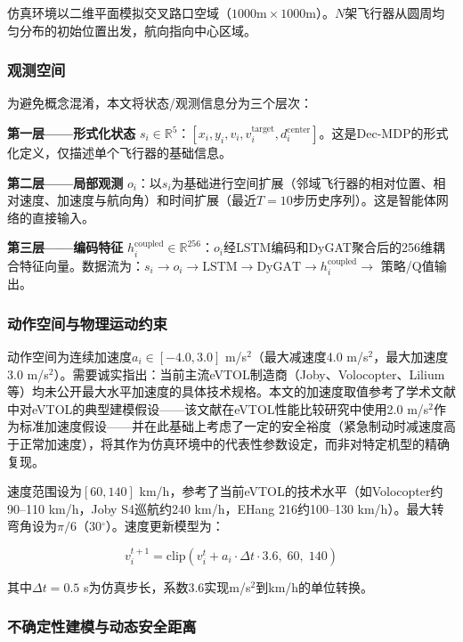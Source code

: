 \documentclass[12pt,a4paper,UTF8]{ctexart}
\begin{document}
仿真环境以二维平面模拟交叉路口空域（$1000\text{m} \times 1000\text{m}$）。$N$架飞行器从圆周均匀分布的初始位置出发，航向指向中心区域。

\subsubsection{观测空间}

为避免概念混淆，本文将状态/观测信息分为三个层次：

\textbf{第一层——形式化状态} $s_i \in \mathbb{R}^5$：$[x_i, y_i, v_i, v_i^{\text{target}}, d_i^{\text{center}}]$。这是Dec-MDP的形式化定义，仅描述单个飞行器的基础信息。

\textbf{第二层——局部观测} $o_i$：以$s_i$为基础进行空间扩展（邻域飞行器的相对位置、相对速度、加速度与航向角）和时间扩展（最近$T=10$步历史序列）。这是智能体网络的直接输入。

\textbf{第三层——编码特征} $h_i^{\text{coupled}} \in \mathbb{R}^{256}$：$o_i$经LSTM编码和DyGAT聚合后的256维耦合特征向量。数据流为：$s_i \to o_i \to \text{LSTM} \to \text{DyGAT} \to h_i^{\text{coupled}} \to$ 策略/Q值输出。

\subsubsection{动作空间与物理运动约束}

动作空间为连续加速度$a_i \in [-4.0, 3.0]$ m/s$^2$（最大减速度4.0 m/s$^2$，最大加速度3.0 m/s$^2$）。需要诚实指出：当前主流eVTOL制造商（Joby、Volocopter、Lilium等）均未公开最大水平加速度的具体技术规格。本文的加速度取值参考了学术文献中对eVTOL的典型建模假设\cite{ref25}——该文献在eVTOL性能比较研究中使用2.0 m/s$^2$作为标准加速度假设——并在此基础上考虑了一定的安全裕度（紧急制动时减速度高于正常加速度），将其作为仿真环境中的代表性参数设定，而非对特定机型的精确复现。

速度范围设为$[60, 140]$ km/h，参考了当前eVTOL的技术水平（如Volocopter约90--110 km/h，Joby S4巡航约240 km/h，EHang 216约100--130 km/h）。最大转弯角设为$\pi/6$（30$^\circ$）。速度更新模型为：

\begin{equation}
    v_i^{t+1} = \text{clip}\left(v_i^{t} + a_i \cdot \Delta t \cdot 3.6,\; 60,\; 140\right)
\end{equation}

其中$\Delta t = 0.5$ s为仿真步长，系数3.6实现m/s$^2$到km/h的单位转换。

\subsubsection{不确定性建模与动态安全距离}
\end{document}
